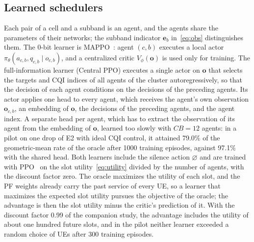 \documentclass{ieeeaccess}
\begin{document}
\subsection{Learned schedulers}
Each pair of a cell and a subband is an agent, and the agents share the parameters of their networks; the subband indicator $\mathbf{e}_b$ in~\eqref{eq:obs} distinguishes them. The 0-bit learner is MAPPO~\cite{yu2022mappo}: agent $(c, b)$ executes a local actor $\pi_{\theta}(a_{c,b}, q_{c,b} \mid o_{c,b})$, and a centralized critic $V_\phi(\mathbf{o})$ is used only for training. The full-information learner (Central PPO) executes a single actor on $\mathbf{o}$ that selects the targets and CQI indices of all agents of the cluster autoregressively, so that the decision of each agent conditions on the decisions of the preceding agents. Its actor applies one head to every agent, which receives the agent's own observation $\mathbf{o}_{c,b}$, an embedding of $\mathbf{o}$, the decisions of the preceding agents, and the agent index. A separate head per agent, which has to extract the observation of its agent from the embedding of $\mathbf{o}$, learned too slowly with $C B = 12$ agents: in a pilot on one drop of E2 with ideal CQI control, it attained 79.0\% of the geometric-mean rate of the oracle after 1000 training episodes, against 97.1\% with the shared head. Both learners include the silence action $\varnothing$ and are trained with PPO~\cite{schulman2017ppo} on the slot utility~\eqref{eq:utility} divided by the number of agents, with the discount factor zero. The oracle maximizes the utility of each slot, and the PF weights already carry the past service of every UE, so a learner that maximizes the expected slot utility pursues the objective of the oracle; the advantage is then the slot utility minus the critic's prediction of it. With the discount factor 0.99 of the companion study, the advantage includes the utility of about one hundred future slots, and in the pilot neither learner exceeded a random choice of UEs after 300 training episodes.
\end{document}
